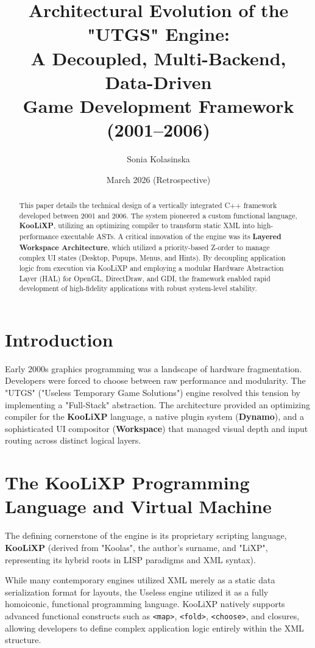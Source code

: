 \documentclass[11pt, a4paper]{article}
\title{\textbf{Architectural Evolution of the "UTGS" Engine: \\ 
A Decoupled, Multi-Backend, Data-Driven \\
Game Development Framework (2001--2006)
}}
\author{Sonia Kolasinska}
\date{March 2026 (Retrospective)}
\begin{document}
\maketitle

\setlength{\parskip}{1em}
\setlength{\parindent}{0pt}

\begin{abstract}
This paper details the technical design of a vertically integrated C++ framework developed between 2001 and 2006. The system pioneered a custom functional language, \textbf{KooLiXP}, utilizing an optimizing compiler to transform static XML into high-performance executable ASTs. A critical innovation of the engine was its \textbf{Layered Workspace Architecture}, which utilized a priority-based Z-order to manage complex UI states (Desktop, Popups, Menus, and Hints). By decoupling application logic from execution via KooLiXP and employing a modular Hardware Abstraction Layer (HAL) for OpenGL, DirectDraw, and GDI, the framework enabled rapid development of high-fidelity applications with robust system-level stability.
\end{abstract}

\section{Introduction}
Early 2000s graphics programming was a landscape of hardware fragmentation. Developers were forced to choose between raw performance and modularity. The "UTGS" ("Useless Temporary Game Solutions") engine resolved this tension by implementing a "Full-Stack" abstraction. The architecture provided an optimizing compiler for the \textbf{KooLiXP} language, a native plugin system (\textbf{Dynamo}), and a sophisticated UI compositor (\textbf{Workspace}) that managed visual depth and input routing across distinct logical layers.

\section{The KooLiXP Programming Language and Virtual Machine}
The defining cornerstone of the engine is its proprietary scripting language, \textbf{KooLiXP} (derived from "Koolas", the author's surname, and "LiXP", representing its hybrid roots in LISP paradigms and XML syntax). 

While many contemporary engines utilized XML merely as a static data serialization format for layouts, the Useless engine utilized it as a fully homoiconic, functional programming language. KooLiXP natively supports advanced functional constructs such as \texttt{<map>}, \texttt{<fold>}, \texttt{<choose>}, and closures, allowing developers to define complex application logic entirely within the XML structure.
\end{document}
